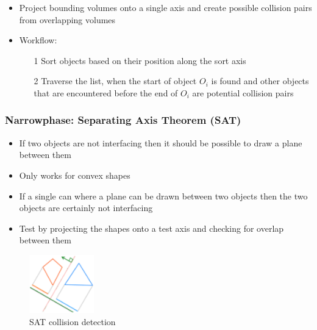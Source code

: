 \documentclass[a4paper]{article}
\begin{document}
\begin{itemize}
  \item
    Project bounding volumes onto a single axis and create possible collision
    pairs from overlapping volumes

  \item
    Workflow:
    \begin{enumerate}
      \item[1]
        Sort objects based on their position along the sort axis

      \item[2]
        Traverse the list, when the start of object $O_{i}$ is found and other
        objects that are encountered before the end of $O_{i}$ are potential
        collision pairs

    \end{enumerate}

\end{itemize}

\subsubsection{Narrowphase: Separating Axis Theorem (SAT)}

\begin{itemize}
  \item
    If two objects are not interfacing then it should be possible to draw a
    plane between them

  \item
    Only works for convex shapes

  \item
    If a single can where a plane can be drawn between two objects then the two
    objects are certainly not interfacing

  \item
    Test by projecting the shapes onto a test axis and checking for overlap
    between them

\end{itemize}

\begin{figure}[h!]
  \centering
  \includegraphics[width=0.25\textwidth]{graphics/coll_det_sat.eps}
  \caption{SAT collision detection}
  \label{fig:coll_det_sat}
\end{figure}
\FloatBarrier
\end{document}
